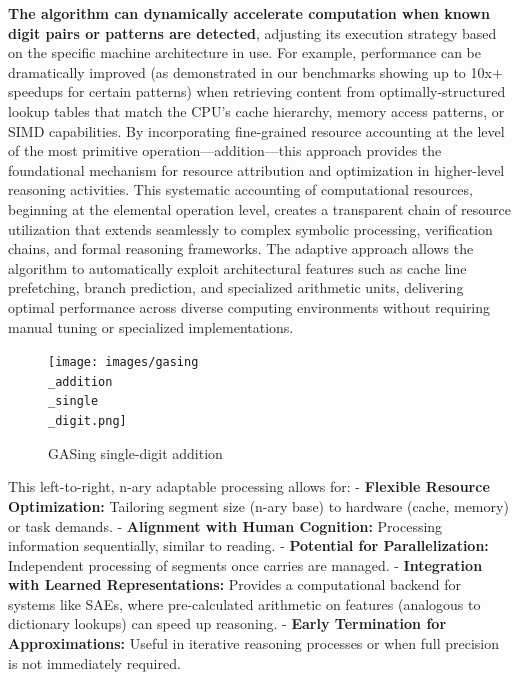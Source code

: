 \textbf{The algorithm can dynamically accelerate computation when known digit pairs or patterns are detected}, adjusting its execution strategy based on the specific machine architecture in use. For example, performance can be dramatically improved (as demonstrated in our benchmarks showing up to 10x+ speedups for certain patterns) when retrieving content from optimally-structured lookup tables that match the CPU's cache hierarchy, memory access patterns, or SIMD capabilities. By incorporating fine-grained resource accounting at the level of the most primitive operation—addition—this approach provides the foundational mechanism for resource attribution and optimization in higher-level reasoning activities. This systematic accounting of computational resources, beginning at the elemental operation level, creates a transparent chain of resource utilization that extends seamlessly to complex symbolic processing, verification chains, and formal reasoning frameworks. The adaptive approach allows the algorithm to automatically exploit architectural features such as cache line prefetching, branch prediction, and specialized arithmetic units, delivering optimal performance across diverse computing environments without requiring manual tuning or specialized implementations.



\begin{figure}[H]
  \centering
  \texttt{[image: images/gasing\\\_addition\\\_single\\\_digit.png]}
  \caption{GASing single-digit addition}
  \label{fig:gasingadditionsingledigit}
\end{figure}



This left-to-right, n-ary adaptable processing allows for:
-   \textbf{Flexible Resource Optimization:} Tailoring segment size (n-ary base) to hardware (cache, memory) or task demands.
-   \textbf{Alignment with Human Cognition:} Processing information sequentially, similar to reading.
-   \textbf{Potential for Parallelization:} Independent processing of segments once carries are managed.
-   \textbf{Integration with Learned Representations:} Provides a computational backend for systems like SAEs, where pre-calculated arithmetic on features (analogous to dictionary lookups) can speed up reasoning.
-   \textbf{Early Termination for Approximations:} Useful in iterative reasoning processes or when full precision is not immediately required.

